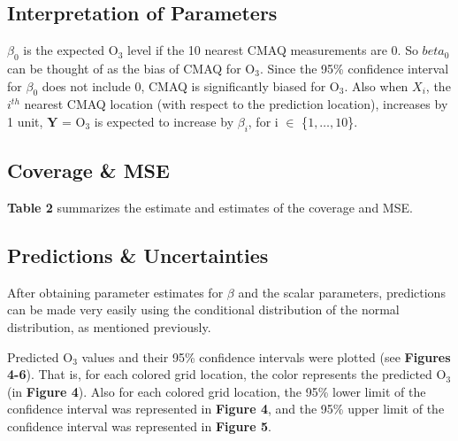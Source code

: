 \documentclass{article}                                                   %
\def\wl{\par \vspace{\baselineskip}}                                      %
\begin{document}
    

  \subsection{Interpretation of Parameters} 
    $\beta_0$ is the expected O$_3$ level if the 10 nearest CMAQ measurements
    are 0. So $beta_0$ can be thought of as the bias of CMAQ for O$_3$. Since
    the 95\% confidence interval for $\beta_0$ does not include 0, CMAQ is
    significantly biased for O$_3$.  Also when $X_i$, the $i^{th}$ nearest CMAQ
    location (with respect to the prediction location), increases by 1 unit,
    $\bm Y$ = O$_3$ is expected to increase by $\beta_i$, for i $\in$
    \{$1,\dots,10$\}.

  \subsection{Coverage \& MSE }
    \textbf{Table 2} summarizes the estimate and estimates of the coverage and MSE.
    

  \subsection{Predictions \& Uncertainties}
    After obtaining parameter estimates for $\beta$ and the scalar parameters,
    predictions can be made very easily using the conditional distribution
    of the normal distribution, as mentioned previously.
    \wl\noindent
    Predicted O$_3$ values and their 95\% confidence intervals were plotted
    (see \textbf{Figures 4-6}). That is, for each colored grid location, the color
    represents the predicted O$_3$ (in \textbf{Figure 4}). Also for each colored
    grid location, the 95\% lower limit of the confidence interval was represented
    in \textbf{Figure 4}, and the 95\% upper limit of the confidence interval
    was represented in \textbf{Figure 5}.
\end{document}
